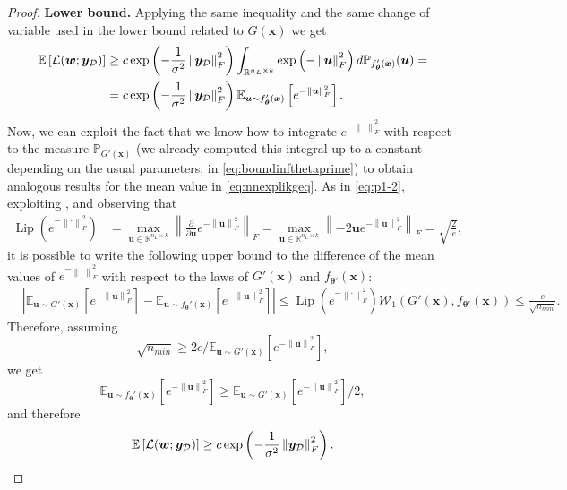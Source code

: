 \documentclass[a4paper, 11pt, reqno]{amsart}
\theoremstyle{plain}
\theoremstyle{remark}
\theoremstyle{definition}
\newcommand{\mean}[2][\kern-0.5pt]{\mathbb{E}_{#1}\left[#2\right]}
\newcommand{\wass}[3][2]{\mathcal{W}_{#1}\left(#2, #3\right)}
\newcommand{\real}{\mathbb{R}}
\newcommand{\norm}[1]{\left\lVert#1\right\rVert}
\newcommand{\lipschitz}[1]{\operatorname{Lip}\left(#1\right)}
\renewcommand{\exp}[1]{\operatorname{exp}\left(#1\right)}
\begin{document}
\begin{proof}
	\textbf{Lower bound.} Applying the same inequality and the same change of variable used in the lower bound related to $G(\bm{x})$ we get 
	\begin{align} \label{eq:nnexplikgeq}
		\mean{\mathcal{L}(\bm{w}; \bm{y}_{\mathcal{D}})} & \geq c \exp{-\frac{1}{\sigma^2} \norm{\bm{y}_{\mathcal{D}}}_F^2} \int_{\real^{n_L \times k}} \exp{-\norm{\bm{u}}_F^2} d \mathbb{P}_{f_{\bm{\theta}}'(\bm{x})}(\bm{u}) \nonumber = \\
		& = c \exp{-\frac{1}{\sigma^2} \norm{\bm{y}_{\mathcal{D}}}_F^2} \mean[\bm{u} \sim f_{\bm{\theta}}'(\bm{x})]{e^{-\norm{\bm{u}}_F^2}}.
	\end{align}
	Now, we can exploit the fact that we know how to integrate $e^{-\norm{\bm{\cdot}}_F^2}$ with respect to the measure $\mathbb{P}_{G'(\bm{x})}$ (we already computed this integral up to a constant depending on the usual parameters, in \cref{eq:boundinfthetaprime}) to obtain analogous results for the mean value in \cref{eq:nnexplikgeq}. 
	As in \cref{eq:p1-2}, exploiting , and observing that
	\begin{align*}
		\lipschitz{e^{-\norm{\bm{\cdot}}_F^2}} & = \max_{\bm{u} \in \real^{n_L \times k}} \norm{\frac{\partial}{\partial \bm{u}} e^{-\norm{\bm{u}}_F^2}}_F = \max_{\bm{u} \in \real^{n_L \times k}} \norm{-2 \bm{u} e^{-\norm{\bm{u}}_F^2}}_F = \sqrt{\frac{2}{e}},
	\end{align*}
	it is possible to write the following upper bound to the difference of the mean values of $e^{-\norm{\bm{\cdot}}_F^2}$ with respect to the laws of $G'(\bm{x})$ and $f_{\bm{\theta}'}(\bm{x})$:
	\begin{equation} \label{eq:boundmeanexpscaled}
		\begin{aligned}
			& \left|\mean[\bm{u} \sim G'(\bm{x})]{e^{-\norm{\bm{u}}_F^2}} - \mean[\bm{u} \sim f_{\bm{\theta}}'(\bm{x})]{e^{-\norm{\bm{u}}_F^2}}\right| \leq \lipschitz{e^{-\norm{\bm{\cdot}}_F^2}} \wass[1]{G'(\bm{x})}{f_{\bm{\theta}'}(\bm{x})} \leq \frac{c}{\sqrt{n_{min}}}.
		\end{aligned}
	\end{equation}
	Therefore, assuming 
	\begin{equation*}
		\sqrt{n_{min}} \geq 2c / \mean[\bm{u} \sim G'(\bm{x})]{e^{-\norm{\bm{u}}_F^2}},
	\end{equation*}
	we get 
	\begin{equation*}
		\mean[\bm{u} \sim f_{\bm{\theta}}'(\bm{x})]{e^{-\norm{\bm{u}}_F^2}} \geq \mean[\bm{u} \sim G'(\bm{x})]{e^{-\norm{\bm{u}}_F^2}} / 2,
	\end{equation*}
	and therefore
	\begin{equation*}
		\mean{\mathcal{L}(\bm{w}; \bm{y}_{\mathcal{D}})} \geq c \exp{-\frac{1}{\sigma^2} \norm{\bm{y}_{\mathcal{D}}}_F^2}.
	\end{equation*}


\end{proof}
\end{document}
